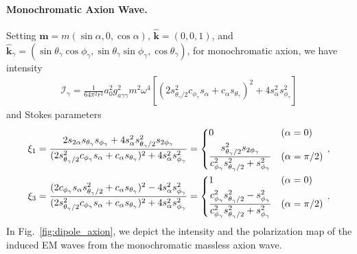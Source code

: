 \documentclass[a4paper,11pt]{article}
\begin{document}
\paragraph{Monochromatic Axion Wave.}
%
Setting $ \bm{m} = m(\sin\alpha , 0 , \cos \alpha) $, $ \hat{ \bm k} = (0,0,1) $, and $ \hat{\bm k}_{\gamma } = (\sin \theta_{\gamma} \cos \phi_{\gamma}, \sin \theta_{\gamma} \sin \phi_{\gamma}, \cos \theta_{\gamma} ) $, for monochromatic axion, we have intensity
\begin{align}
    \mathcal{I}_{\gamma}=  \frac{1}{64 \pi^{2} r^{2} } a_{0}^{2} g_{a\gamma\gamma}^{2} m^{2} \omega^{4} \left[ \left( 2 s_{\theta_{\gamma}/2}^{2} c_{\phi_{\gamma}} s_{\alpha} + c_{\alpha} s_{\theta_{\gamma}} \right)^{2} + 4 s_{\alpha}^{2} s_{\phi_{\gamma}}^{2} \right]
\end{align}
%
and Stokes parameters
%
\begin{equation}
\begin{aligned}
    \xi_{1} & = \frac{ 2 s_{2\alpha} s_{\theta_{\gamma}} s_{\phi_{\gamma}} + 4 s_{\alpha}^{2} s_{\theta_{\gamma}/2}^{2} s_{2\phi_{\gamma}}  }{ ( 2 s_{\theta_{\gamma}/2}^{2} c_{\phi_{\gamma}} s_{\alpha} + c_{\alpha} s_{\theta_{\gamma}} )^{2} + 4 s_{\alpha}^{2} s_{\phi_{\gamma}}^{2}  } = \begin{dcases}
        0 & (\alpha = 0 ) \\
        \frac{s_{\theta_{\gamma}/2}^{2} s_{2\phi_{\gamma}}}{c_{\phi_{\gamma}}^{2} s_{\theta_{\gamma}/2}^{2} + s_{\phi_{\gamma}}^{2}  }& (\alpha = \pi/ 2)
    \end{dcases} \,, 
    \\ \xi_{3} & = \frac{ (2c_{\phi_{\gamma}} s_{\alpha} s_{\theta_{\gamma}/2}^{2} + c_{\alpha} s_{\theta_{\gamma}})^{2} - 4 s_{\alpha}^{2} s_{\phi_{\gamma}}^{2}  }{ ( 2 s_{\theta_{\gamma}/2}^{2} c_{\phi_{\gamma}} s_{\alpha} + c_{\alpha} s_{\theta_{\gamma}} )^{2} + 4 s_{\alpha}^{2} s_{\phi_{\gamma}}^{2}  } =
    \begin{dcases}
        1 & (\alpha = 0 )\\
 \frac{ c_{\phi_{\gamma}}^{2} s_{\theta_{\gamma}/2}^{2} - s_{\phi_{\gamma}}^{2}  }{ c_{\phi_{\gamma}}^{2} s_{\theta_{\gamma}/2}^{2} + s_{\phi_{\gamma}}^{2}  } & (\alpha = \pi/2)
    \end{dcases} \,.
\end{aligned}
\end{equation}
%
In Fig.~\ref{fig:dipole_axion}, we depict the intensity and the polarization map of the induced EM waves from the monochromatic massless axion wave.
\end{document}
